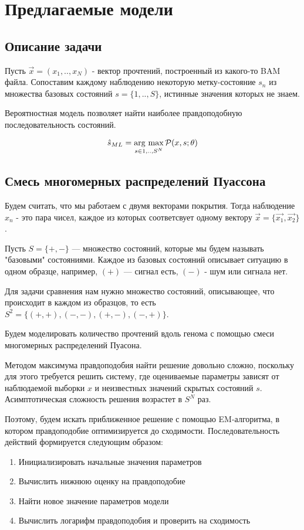 \documentclass{matmex-diploma}
\begin{document}
\section{Предлагаемые модели}
\subsection{Описание задачи}

Пусть $\vec{x}=(x_1,..,x_N)$ - вектор прочтений, построенный из какого-то BAM файла.
Сопоставим каждому наблюдению некоторую метку-состояние $s_n$ из множества базовых состояний $s=\{1,..,S\}$, истинные значения которых не знаем. 

Вероятностная модель позволяет найти наиболее правдоподобную последовательность состояний.

\newcommand{\argmax}{\mathop{\rm arg~max}\limits}
$$\hat{s}_{ML} = \argmax_{s \in {1,..,S}^N} \mathcal{P}(x,s;\theta)$$

\subsection{Смесь многомерных распределений Пуассона}

Будем считать, что мы работаем с двумя векторами покрытия.
Тогда наблюдение $x_n$ - это пара чисел, каждое из которых соответсвует одному вектору $\vec{x}=\{\vec{x_1},\vec{x_2}\}$.

Пусть $S = \{+, -\}$ — множество состояний, которые мы будем называть "базовыми" состояниями. Каждое из базовых состояний описывает ситуацию в одном образце, например, $(+)$ — сигнал есть, $(-)$ - шум или сигнала нет. 

Для задачи сравнения нам нужно множество состояний, описывающее, что происходит в каждом из образцов, то есть $S^2 = \{(+, +), (-, -), (+, -), (-, +)\}$.

Будем моделировать количество прочтений вдоль генома с помощью смеси многомерных распределений Пуасона.

Методом максимума правдоподобия найти решение довольно сложно, поскольку для этого требуется решить систему, где оцениваемые параметры зависят от наблюдаемой выборки $x$ и неизвестных значений скрытых состояний $s$. Асимптотическая сложность решения возрастет в $S^N$ раз.

Поэтому, будем искать приближенное решение с помощью EM-алгоритма, в котором правдоподобие оптимизируется до сходимости. Последовательность действий формируется следующим образом\cite{book:Bishop}:
\begin{enumerate}
\item
Инициализировать начальные значения параметров
\item
Вычислить нижнюю оценку на правдоподобие
\item
Найти новое значение параметров модели
\item
Вычислить логарифм правдоподобия и проверить на сходимость
\end{enumerate}
\end{document}

